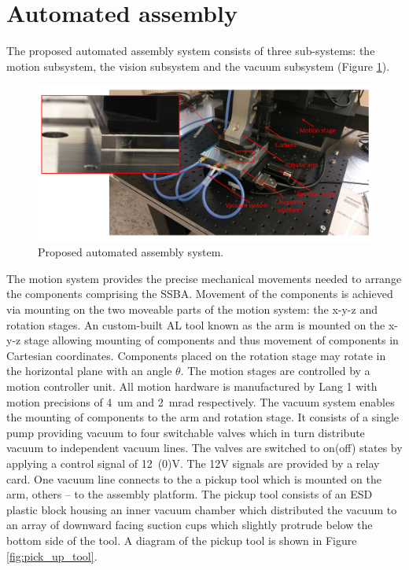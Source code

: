 \section{Automated assembly}

The proposed automated assembly system consists of three sub-systems: the motion subsystem, the vision subsystem and the vacuum subsystem (Figure \ref{fig:auto_assembly_system})\cite{AutomatedAssembly_tutorial}.

\begin{figure}[ht]\centering
\includegraphics[width=1\linewidth]{Data/Module_assembly/Automated_assembly_system.png}
\caption{Proposed automated assembly system.}
\label{fig:auto_assembly_system}
\end{figure}

The motion system provides the precise mechanical movements needed to arrange the components comprising the SSBA. Movement of the components is achieved via mounting on the two moveable parts of the motion system: the x-y-z and rotation stages. An custom-built AL tool known as the arm is mounted on the x-y-z stage allowing mounting of components and thus movement of components in Cartesian coordinates. Components placed on the rotation stage may rotate in the horizontal plane with an angle $\theta$. The motion stages are controlled by a motion controller unit. All motion hardware is manufactured by Lang 1 with motion precisions of 4~um and 2~mrad respectively. The vacuum system enables the mounting of components to the arm and rotation stage. It consists of a single pump providing vacuum to four switchable valves which in turn distribute vacuum to independent vacuum lines. The valves are switched to on(off) states by applying a control signal of 12~(0)V. The 12V signals are provided by a relay card. One vacuum line connects to the a pickup tool which is mounted on the arm, others -- to the assembly platform. The pickup tool consists of an ESD plastic block housing an inner vacuum chamber which distributed the vacuum to an array of downward facing suction cups which slightly protrude below the bottom side of the tool. A diagram of the pickup tool is shown in Figure \ref{fig:pick_up_tool}.

